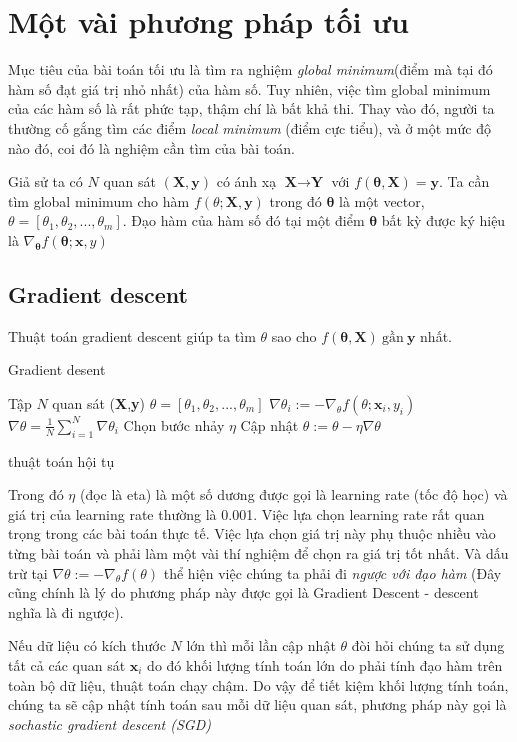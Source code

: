 \section{Một vài phương pháp tối ưu}
\label{sec:toiuu}
 Mục tiêu của bài toán tối ưu là tìm ra nghiệm \textit{global minimum}(điểm mà tại đó hàm số đạt giá trị nhỏ nhất) của hàm số.  Tuy nhiên, việc tìm global minimum của các hàm số là rất phức tạp, thậm chí là bất khả thi. Thay vào đó, người ta thường cố gắng tìm các điểm \textit{local minimum} (điểm cực tiểu), và ở một mức độ nào đó, coi đó là nghiệm cần tìm của bài toán.\par
Giả sử ta có $N$ quan sát $(\textbf{X},\textbf{y})$ có ánh xạ $\textbf{X} \to \textbf{Y}$ với $f(\mathbf{\theta},\textbf{X})=\textbf{y}$. Ta cần tìm global minimum cho hàm $f(\theta;\textbf{X},\textbf{y})$ trong đó $\mathbf{\theta}$ là một vector, $\theta=[\theta_1,\theta_2,...,\theta_m]$. Đạo hàm của hàm số đó tại một điểm   $\mathbf{\theta}$ bất kỳ được ký hiệu là $\nabla_\mathbf{\theta} f(\mathbf{\theta};\textbf{x},y)$
\subsection{Gradient descent}
 Thuật toán gradient descent giúp ta tìm $\theta$ sao cho $f(\mathbf{\theta},\textbf{X})~\text{gần}~\textbf{y}$ nhất.
\begin{algorithm}[H]
\label{alg:grad}
\caption{Gradient desent}
\begin{algorithmic}[1]
\REQUIRE Tập $N$ quan sát (\textbf{X},\textbf{y})
\REQUIRE $\theta=[\theta_1,\theta_2,...,\theta_m]$
\REPEAT 
{}
\STATE $\nabla \theta_i := - \nabla_{\theta}f(\theta;\textbf{x}_i,y_i)$
\ENDFOR
\STATE $\nabla \theta  =\frac{1}{N} \sum^{N}_{i=1}\nabla\theta_i$
\STATE Chọn bước nhảy $\eta$
\STATE Cập nhật $\theta := \theta - \eta\nabla\theta$

\UNTIL	thuật toán hội tụ
\end{algorithmic}
\end{algorithm}
Trong đó $\eta$ (đọc là eta) là một số dương được gọi là learning rate (tốc độ học) và giá trị của learning rate thường là 0.001. Việc lựa chọn learning rate rất quan trọng trong các bài toán thực tế. Việc lựa chọn giá trị này phụ thuộc nhiều vào từng bài toán và phải làm một vài thí nghiệm để chọn ra giá trị tốt nhất. Và dấu trừ tại $\nabla \theta := - \nabla_{\theta}f(\theta)$ thể hiện việc chúng ta phải đi\textit{ ngược với đạo hàm} (Đây cũng chính là lý do phương pháp này được gọi là Gradient Descent - descent nghĩa là đi ngược).\par
Nếu dữ liệu có kích thước $N$ lớn thì mỗi lần cập nhật $\theta$ đòi hỏi chúng ta sử dụng tất cả các quan sát $\textbf{x}_i$ do đó khối lượng tính toán lớn do phải tính đạo hàm trên toàn bộ dữ liệu, thuật toán chạy chậm. Do vậy để tiết kiệm khối lượng tính toán, chúng ta sẽ cập nhật tính toán sau mỗi dữ liệu quan sát, phương pháp này gọi là \textit{sochastic gradient descent (SGD)}

